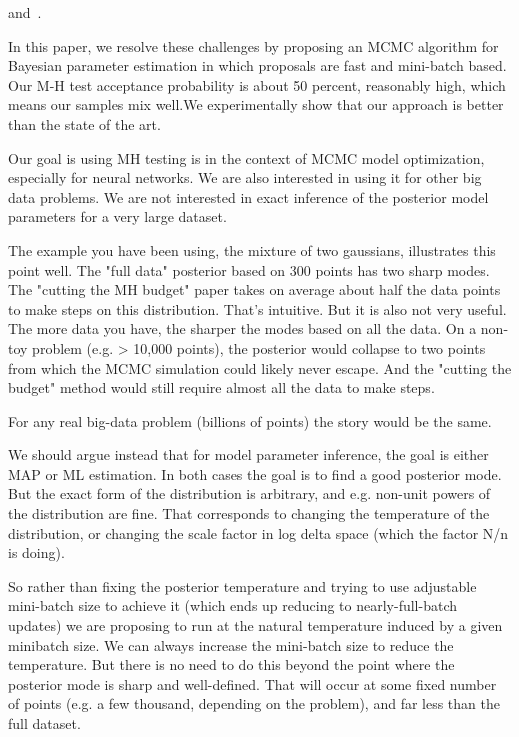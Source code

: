 \documentclass{article}
\begin{document}
and~\cite{RobbinsMonro1951}.

In this paper, we resolve these challenges by proposing an MCMC algorithm for Bayesian parameter
estimation in which proposals are fast and mini-batch based. Our M-H test acceptance probability is
about 50 percent, reasonably high, which means our samples mix well.We experimentally show that our
approach is better than the state of the art.

Our goal is using MH testing is in the context of MCMC model optimization, especially for neural
networks. We are also interested in using it for other big data problems. We are not interested in
exact inference of the posterior model parameters for a very large dataset. 

The example you have been using, the mixture of two gaussians, illustrates this point well. The
"full data" posterior  based on 300 points has two sharp modes. The "cutting the MH budget" paper
takes on average about half the data points to make steps on this distribution. That's intuitive.
But it is also not very useful. The more data you have, the sharper the modes based on all the data.
On a non-toy problem (e.g. > 10,000 points), the posterior would collapse to two points from which
the MCMC simulation could likely never escape. And the "cutting the budget" method would still
require almost all the data to make steps. 

For any real big-data problem (billions of points) the story would be the same. 

We should argue instead that for model parameter inference, the goal is either MAP or ML estimation.
In both cases the goal is to find a good posterior mode. But the exact form of the distribution is
arbitrary, and e.g. non-unit powers of the distribution are fine. That corresponds to changing the
temperature of the distribution, or changing the scale factor in log delta space (which the factor
N/n is doing). 

So rather than fixing the posterior temperature and trying to use adjustable mini-batch size to
achieve it (which ends up reducing to nearly-full-batch updates) we are proposing to run at the
natural temperature induced by a given minibatch size. We can always increase the mini-batch size to
reduce the temperature. But there is no need to do this beyond the point where the posterior mode is
sharp and well-defined. That will occur at some fixed number of points (e.g. a few thousand,
depending on the problem), and far less than the full dataset.
\end{document}
